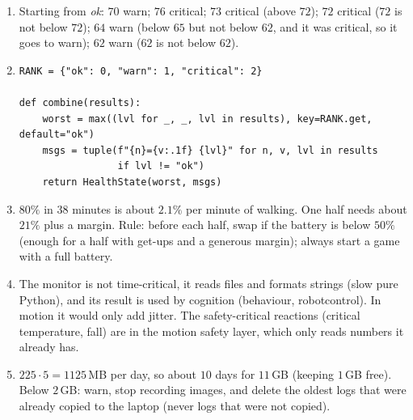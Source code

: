 \begin{enumerate}[label=\textbf{\ansnum.\arabic*}]
  \item Starting from \emph{ok}: $70$ warn; $76$ critical; $73$ critical (above $72$); $72$ critical ($72$ is not below $72$); $64$ warn (below $65$ but not below $62$, and it was critical, so it goes to warn); $62$ warn ($62$ is not below $62$).
  \item
\begin{verbatim}
RANK = {"ok": 0, "warn": 1, "critical": 2}

def combine(results):
    worst = max((lvl for _, _, lvl in results), key=RANK.get, default="ok")
    msgs = tuple(f"{n}={v:.1f} {lvl}" for n, v, lvl in results
                 if lvl != "ok")
    return HealthState(worst, msgs)
\end{verbatim}
  \item $80\%$ in $38$ minutes is about $2.1\%$ per minute of walking. One half needs about $21\%$ plus a margin. Rule: before each half, swap if the battery is below $50\%$ (enough for a half with get-ups and a generous margin); always start a game with a full battery.
  \item The monitor is not time-critical, it reads files and formats strings (slow pure Python), and its result is used by cognition (behaviour, robotcontrol). In motion it would only add jitter. The safety-critical reactions (critical temperature, fall) are in the motion safety layer, which only reads numbers it already has.
  \item $225\cdot5=1125$\,MB per day, so about $10$ days for $11$\,GB (keeping $1$\,GB free). Below $2$\,GB: warn, stop recording images, and delete the oldest logs that were already copied to the laptop (never logs that were not copied).
\end{enumerate}
